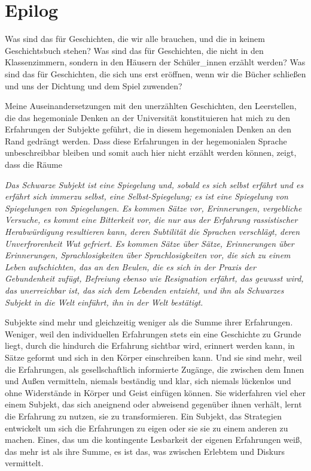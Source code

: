 \section{Epilog}
Was sind das für Geschichten, die wir alle brauchen, und die in
keinem Geschichtsbuch stehen? Was sind das für Geschichten, die nicht in den
Klassenzimmern, sondern in den Häusern der Schüler\_innen erzählt werden? Was
sind das für Geschichten, die sich uns erst eröffnen, wenn wir die Bücher
schließen und uns der Dichtung und dem Spiel zuwenden?

Meine Auseinandersetzungen mit den unerzählten Geschichten, den Leerstellen, die
das hegemoniale Denken an der Universität konstituieren hat mich zu den
Erfahrungen der Subjekte geführt, die in diesem hegemonialen Denken an den Rand
gedrängt werden. Dass diese Erfahrungen in der hegemonialen Sprache
unbeschreibbar bleiben und somit auch hier nicht erzählt werden  können, zeigt,
dass die Räume

\begin{myenv}
\textit{Das Schwarze Subjekt ist eine Spiegelung und, sobald es sich selbst erfährt und
es erfährt sich immerzu selbst, eine Selbst-Spiegelung; es ist eine Spiegelung
von Spiegelungen von Spiegelungen. Es kommen Sätze vor, Erinnerungen,
vergebliche Versuche, es kommt eine Bitterkeit vor, die nur aus der Erfahrung
rassistischer Herabwürdigung resultieren kann, deren Subtilität die Sprachen
verschlägt, deren Unverfrorenheit Wut gefriert. Es kommen Sätze über Sätze,
Erinnerungen über Erinnerungen, Sprachlosigkeiten über Sprachlosigkeiten vor,
die sich zu einem Leben aufschichten, das an den Beulen, die es sich in der
Praxis der Gebundenheit zufügt, Befreiung ebenso wie Resignation erfährt, das
gewusst wird, das unerreichbar ist, das sich dem Lebenden entzieht, und ihn als
Schwarzes Subjekt in die Welt einführt, ihn in der Welt bestätigt.\footnotemark
{}}
\end{myenv}

Subjekte sind mehr und gleichzeitig weniger als die Summe ihrer Erfahrungen.
Weniger, weil den individuellen Erfahrungen stets ein eine Geschichte zu Grunde
liegt, durch die hindurch die Erfahrung sichtbar wird, erinnert werden kann, in
Sätze geformt und sich in den Körper einschreiben kann. Und sie sind mehr, weil
die Erfahrungen, als gesellschaftlich informierte Zugänge, die zwischen dem
Innen und Außen vermitteln, niemals beständig und klar, sich niemals lückenlos
und ohne Widerstände in Körper und Geist einfügen können. Sie widerfahren viel
eher einem Subjekt, das sich aneignend oder abweisend gegenüber ihnen verhält,
lernt die Erfahrung zu nutzen, sie zu transformieren. Ein Subjekt, das
Strategien entwickelt um sich die Erfahrungen zu eigen oder sie sie zu einem
anderen zu machen. Eines, das um die kontingente Lesbarkeit der eigenen
Erfahrungen weiß, das mehr ist als ihre Summe, es ist das, was zwischen Erlebtem
und Diskurs vermittelt.


